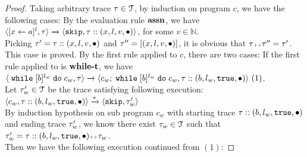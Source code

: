     \begin{proof}
      Taking arbitrary trace $\mathtt{\tau} \in \mathcal{T}$, by induction on program $c$, we have the following cases:
      By the evaluation rule $\rname{assn}$, we have
      $
      {
      \langle [\mathrel{ {x} \leftarrow a }]^{l},  \mathtt{\tau}  \rangle 
      \xrightarrow{} 
      \langle \mathtt{skip}, \mathtt{\tau} :: ({x}, l, v, \bullet) \rangle
      }$, for some $v \in \mathbb{N}$.
      \\
      Picking $\mathtt{\tau}' = \mathtt{\tau} ::({x}, l, v, \bullet)$ and $\mathtt{\tau}'' =  [({x}, l, v, \bullet) ]$,
      it is obvious that $\mathtt{\tau} {\scriptscriptstyle ++} \mathtt{\tau}'' = \mathtt{\tau}'$.
      \\
      This case is proved.
      By the first rule applied to $c$, there are two cases:
      If the first rule applied to is $\rname{while-t}$, we have
      \\
      $\langle {\;\ensuremath{\mathtt{while}}\;[b]^{l_w} \;\ensuremath{\mathtt{do}}\;c_w, \ensuremath{\mathtt{\tau}}} \rangle
        \xrightarrow{} 
        \langle {
        c_w; \;\ensuremath{\mathtt{while}}\;[b]^{l_w} \;\ensuremath{\mathtt{do}}\;c_w,
        \ensuremath{\mathtt{\tau}}:: (b, l_w, \ensuremath{\mathtt{true}}, \bullet)} \rangle~ (1)
      $.
      \\
      Let $\mathtt{\tau}_w' \in \mathcal{T}$ be the trace satisfying following execution:
      \\
      $
      \langle {
      c_w,
      \ensuremath{\mathtt{\tau}}:: (b, l_w, \ensuremath{\mathtt{true}}, \bullet)} \rangle
      \xrightarrow{*} 
      \langle {
      \ensuremath{\mathtt{skip}}, \ensuremath{\mathtt{\tau}}_w'} \rangle
    $
    \\
    By induction hypothesis on sub program $c_w$ with starting trace 
    $\mathtt{\tau} :: (b, l_w, \mathtt{true}, \bullet)$ and ending trace $\mathtt{\tau}_w'$, 
    we know there exist
    $\mathtt{\tau}_w \in \mathcal{T}$ such that $\mathtt{\tau}_w' = \mathtt{\tau} :: (b, l_w, \mathtt{true}, \bullet) {\scriptscriptstyle ++} \mathtt{\tau}_w$.
    \\
    Then we have the following execution continued from $(1)$:

\end{proof}
